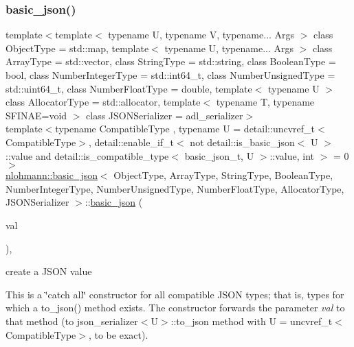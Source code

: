 \subsubsection{\texorpdfstring{basic\+\_\+json()}{basic\_json()}\hspace{0.1cm}{\footnotesize\ttfamily [3/9]}}
{\footnotesize\ttfamily template$<$template$<$ typename U, typename V, typename... Args $>$ class Object\+Type = std\+::map, template$<$ typename U, typename... Args $>$ class Array\+Type = std\+::vector, class String\+Type  = std\+::string, class Boolean\+Type  = bool, class Number\+Integer\+Type  = std\+::int64\+\_\+t, class Number\+Unsigned\+Type  = std\+::uint64\+\_\+t, class Number\+Float\+Type  = double, template$<$ typename U $>$ class Allocator\+Type = std\+::allocator, template$<$ typename T, typename S\+F\+I\+N\+A\+E=void $>$ class J\+S\+O\+N\+Serializer = adl\+\_\+serializer$>$ \\
template$<$typename Compatible\+Type , typename U  = detail\+::uncvref\+\_\+t$<$\+Compatible\+Type$>$, detail\+::enable\+\_\+if\+\_\+t$<$ not detail\+::is\+\_\+basic\+\_\+json$<$ U $>$\+::value and detail\+::is\+\_\+compatible\+\_\+type$<$ basic\+\_\+json\+\_\+t, U $>$\+::value, int $>$  = 0$>$ \\
\mbox{\hyperlink{classnlohmann_1_1basic__json}{nlohmann\+::basic\+\_\+json}}$<$ Object\+Type, Array\+Type, String\+Type, Boolean\+Type, Number\+Integer\+Type, Number\+Unsigned\+Type, Number\+Float\+Type, Allocator\+Type, J\+S\+O\+N\+Serializer $>$\+::\mbox{\hyperlink{classnlohmann_1_1basic__json}{basic\+\_\+json}} (\begin{DoxyParamCaption}\item[{Compatible\+Type \&\&}]{val }\end{DoxyParamCaption})\hspace{0.3cm}{\ttfamily [inline]}, {\ttfamily [noexcept]}}



create a J\+S\+ON value 

This is a \char`\"{}catch all\char`\"{} constructor for all compatible J\+S\+ON types; that is, types for which a {\ttfamily to\+\_\+json()} method exists. The constructor forwards the parameter {\itshape val} to that method (to {\ttfamily json\+\_\+serializer$<$U$>$\+::to\+\_\+json} method with {\ttfamily U = uncvref\+\_\+t$<$Compatible\+Type$>$}, to be exact).

